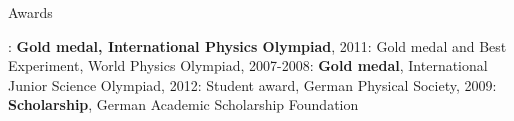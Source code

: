 \begin{rubric}{Awards}

\newcommand\textbox[1]{%
  \parbox{\textwidth}{#1}%
}
  \textbox{
: \textbf{Gold medal, International Physics Olympiad}, 2011: Gold medal and Best Experiment, World Physics Olympiad, 2007-2008: \textbf{Gold medal}, International Junior Science Olympiad, 2012: Student award, German Physical Society, 2009: \textbf{Scholarship}, German Academic Scholarship Foundation}
\end{rubric}
